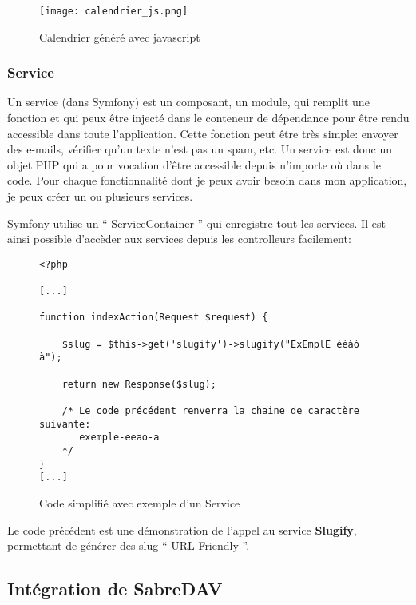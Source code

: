 \begin{figure}[h]
\begin{center}
\texttt{[image: calendrier\_js.png]}
\end{center}
\caption{Calendrier généré avec javascript}
\end{figure}

\newpage

\subsubsection*{Service}

Un service (dans Symfony) est un composant, un module, qui remplit une fonction et qui peux être injecté dans le conteneur de dépendance pour être rendu accessible dans toute l'application. Cette fonction peut être très simple: envoyer des e-mails, vérifier qu'un texte n'est pas un spam, etc. Un service est donc un objet PHP qui a pour vocation d'être accessible depuis n'importe où dans le code. Pour chaque fonctionnalité dont je peux avoir besoin dans mon application, je peux créer un ou plusieurs services.

Symfony utilise un `` ServiceContainer '' qui enregistre tout les services. Il est ainsi possible d'accèder aux services depuis les controlleurs facilement:

\begin{figure}[h]
\begin{lstlisting}[frame=single]
<?php

[...]

function indexAction(Request $request) {

    $slug = $this->get('slugify')->slugify("ExEmplE èéàó à");

    return new Response($slug);

    /* Le code précédent renverra la chaine de caractère suivante:
       exemple-eeao-a
    */
}
[...]

\end{lstlisting}
\caption{Code simplifié avec exemple d'un Service}
\end{figure}

Le code précédent est une démonstration de l'appel au service \textbf{Slugify}, permettant de générer des slug `` URL Friendly ''.

\subsection{Intégration de SabreDAV}

